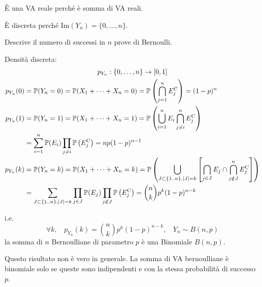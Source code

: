 \begin{enumerate}
È una VA reale perché è somma di VA reali.

È discreta perché $\mathrm{Im}( Y_{n}) =\{0,\dots ,n\}$.

Descrive il numero di successi in $n$ prove di Bernoulli.

Densità discreta:
\begin{gather*}
p_{Y_{n}} :\{0,\dots ,n\}\rightarrow [ 0,1]\\
\begin{aligned}
p_{Y_{n}}( 0) & =\mathbb{P}( Y_{n} =0) =\mathbb{P}( X_{1} +\cdots +X_{n} =0) =\mathbb{P}\left(\bigcap _{j=1}^{n} E_{j}^{\mathrm{C}}\right) =( 1-p)^{n}\\
p_{Y_{n}}( 1) & =\mathbb{P}( Y_{n} =1) =\mathbb{P}( X_{1} +\cdots +X_{n} =1) =\mathbb{P}\left(\bigcup _{i=1}^{n} E_{i}\bigcap _{j\neq i}^{n} E_{j}^{\mathrm{C}}\right)\\
 & =\sum\limits _{i=1}^{n}\mathbb{P}( E_{i})\prod _{j\neq i}\mathbb{P}\left( E_{j}^{\mathrm{C}}\right) =np( 1-p)^{n-1}\\
p_{Y_{n}}( k) & =\mathbb{P}( Y_{n} =k) =\mathbb{P}( X_{1} +\cdots +X_{n} =k) =\mathbb{P}\left(\bigcup\limits _{J\subset \{1..n\} ,| J| =k}\left[\bigcap _{j\in J} E_{j} \cap \bigcap _{j\notin J}^{n} E_{j}^{\mathrm{C}}\right]\right)\\
 & =\sum\limits _{J\subset \{1..n\} ,| J| =k}\prod _{j\in J} \mathbb{P}( E_{j})\prod _{j\notin J}\mathbb{P}\left( E_{j}^{\mathrm{C}}\right) =\binom{n}{k} p^{k}( 1-p)^{n-k}
\end{aligned}
\end{gather*}

i.e.
\begin{equation*}
\forall k,\ \ \ \ p_{Y_{n}}\left( k\right) =\binom{n}{k} p^{k}\left( 1-p\right)^{n-k} ,\ \ \ \ Y_{n} \sim B\left( n,p\right)
\end{equation*}
la somma di $n$ Bernoulliane di parametro $p$ è una Binomiale $B\left( n,p\right)$.
\begin{oss}
Questo risultato non è vero in generale. La somma di VA bernoulliane è binomiale solo se queste sono indipendenti e con la stessa probabilità di successo $p$.
\end{oss}


\end{enumerate}
